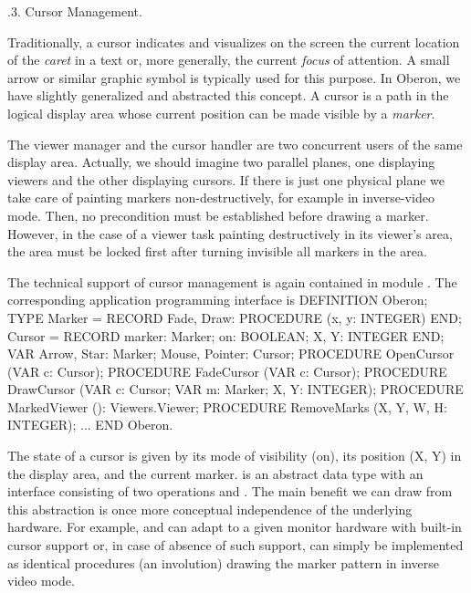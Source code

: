 
.3. Cursor Management.

Traditionally, a cursor indicates and visualizes on the screen the
current location of the \emph{caret} in a text or, more generally, the
current \emph{focus} of attention. A small arrow or similar graphic symbol is
typically used for this purpose. In Oberon, we have slightly
generalized and abstracted this concept. A cursor is a path in the
logical display area whose current position can be made visible by a
\emph{marker}.

The viewer manager and the cursor handler are two concurrent users of
the same display area. Actually, we should imagine two parallel
planes, one displaying viewers and the other displaying cursors. If
there is just one physical plane we take care of painting markers
non-destructively, for example in inverse-video mode. Then, no
precondition must be established before drawing a marker. However, in
the case of a viewer task painting destructively in its viewer's area,
the area must be locked first after turning invisible all markers in
the area.

The technical support of cursor management is again contained in
module . The corresponding application programming interface is
\begintt
DEFINITION Oberon;
  TYPE Marker = RECORD
      Fade, Draw: PROCEDURE (x, y: INTEGER)
    END;
    Cursor = RECORD
      marker: Marker;
      on: BOOLEAN;
      X, Y: INTEGER
    END;
  VAR Arrow, Star: Marker;
      Mouse, Pointer: Cursor;
  PROCEDURE OpenCursor (VAR c: Cursor);
  PROCEDURE FadeCursor (VAR c: Cursor);
  PROCEDURE DrawCursor (VAR c: Cursor; VAR m: Marker; X, Y: INTEGER);
  PROCEDURE MarkedViewer (): Viewers.Viewer;
  PROCEDURE RemoveMarks (X, Y, W, H: INTEGER);
  ...
END Oberon.
\endtt

\noindent The state of a cursor is given by its mode of visibility (on), its
position (X, Y) in the display area, and the current marker.  is
an abstract data type with an interface consisting of two operations
 and . The main benefit we can draw from this abstraction is
once more conceptual independence of the underlying hardware. For
example,  and  can adapt to a given monitor hardware with
built-in cursor support or, in case of absence of such support, can
simply be implemented as identical procedures (an involution) drawing
the marker pattern in inverse video mode.

